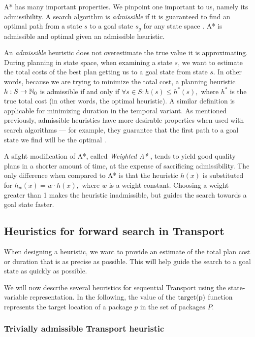 A* has many important properties. We pinpoint one important to us, namely its admissibility.
A search algorithm is \textit{admissible}
if it is guaranteed to find an optimal path from a state $s$
to a goal state $s_g$ for any state space \citep{Hart1968}.
A* is admissible and optimal given an admissible heuristic.

An \textit{admissible} heuristic does not overestimate
the true value it is approximating. During planning in state space,
when examining a state $s$, we want to estimate the total costs of the best
plan getting us to a goal state from state $s$. In other words, because we are
trying to minimize the total cost,
a planning heuristic $h: S \to \mathbb{N}_0$ is admissible if and only if $\forall s \in S : h(s) \leq h^*(s),$
where $h^*$ is the true total cost (in other words, the optimal heuristic). A similar definition is applicable for minimizing duration in the temporal variant.
As mentioned previously, admissible heuristics have more desirable properties when used with search algorithms
--- for example, they guarantee that the first path to a goal state we find
will be the optimal .

A slight modification of A*, called \textit{Weighted A*} \citep{Pohl1970},
tends to yield good quality plans in a shorter amount of time,
at the expense of
sacrificing admissibility. The only difference
when compared to A* is that the heuristic $h(x)$
is substituted for $h_w(x) = w \cdot h(x),$
where $w$ is a weight constant. Choosing a weight greater
than 1 makes the heuristic inadmissible,
but guides the search towards a goal state faster.


\subsection{Heuristics for forward search in Transport}\label{seq-heuristics}

When designing a heuristic, we want to provide an estimate
of the total plan cost or duration
that is as precise as possible. This
will help guide the search to a goal state as quickly as
possible.

We will now describe several heuristics for sequential
Transport using the state-variable representation.
In the following, the value of the $\textrm{target(p)}$ function represents
the target location of a package $p$ in the set of packages $P$.

\subsubsection{Trivially admissible Transport heuristic}\label{sfa0}

